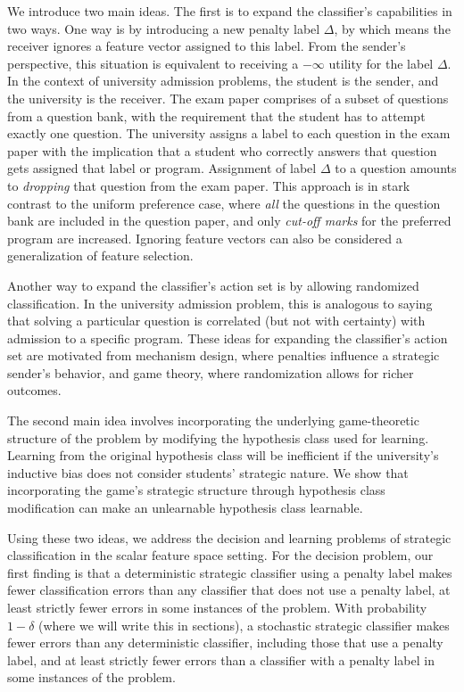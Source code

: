 We introduce two main ideas. The first is to expand the classifier's capabilities in two ways. One way is by introducing a new penalty label $\Delta$, by which means the receiver ignores a feature vector assigned to this label. From the sender's perspective, this situation is equivalent to receiving a $-\infty$ utility for the label $\Delta$. In the context of university admission problems, the student is the sender, and the university is the receiver. The exam paper comprises of a subset of questions from a question bank, with the requirement that the student has to attempt exactly one question. The university assigns a label to each question in the exam paper with the implication that a student who correctly answers that question gets assigned that label or program. Assignment of label $\Delta$ to a question amounts to \textit{dropping} that question from the exam paper. This approach is in stark contrast to the uniform preference case, where \textit{all} the questions in the question bank are included in the question paper, and only \textit{cut-off marks} for the preferred program are increased.
Ignoring feature vectors can also be considered a generalization of feature selection.

Another way to expand the classifier's action set is by allowing randomized classification. In the university admission problem, this is analogous to saying that solving a particular question is correlated (but not with certainty) with admission to a specific program. These ideas for expanding the classifier's action set are motivated from mechanism design, where penalties influence a strategic sender's behavior, and game theory, where randomization allows for richer outcomes.

The second main idea involves incorporating the underlying game-theoretic structure of the problem by modifying the hypothesis class used for learning. Learning from the original hypothesis class will be inefficient if the university's inductive bias does not consider students' strategic nature. We show that incorporating the game's strategic structure through hypothesis class modification can make an unlearnable hypothesis class learnable.

Using these two ideas, we address the decision and learning problems of strategic classification in the scalar feature space setting. For the decision problem, our first finding is that a deterministic strategic classifier using a penalty label makes fewer classification errors than any classifier that does not use a penalty label, at least strictly fewer errors in some instances of the problem. 
With probability $1 - \delta$ (where we will write this in sections), a stochastic strategic classifier makes fewer errors than any deterministic classifier, including those that use a penalty label, and at least strictly fewer errors than a classifier with a penalty label in some instances of the problem.

